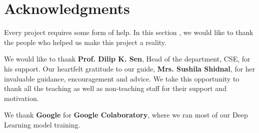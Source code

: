 \documentclass{vldb}
\begin{document}
\section{Acknowledgments}
\noindent Every project requires some form of help. In this section , we would like to thank the people who helped us make this project a reality.
\par\bigskip
We would like to thank \textbf{Prof. Dilip K. Sen}, Head of the department, CSE, for his support. Our heartfelt gratitude to our guide, \textbf{Mrs. Sushila Shidnal}, for her invaluable guidance, encouragement and advice. We take this opportunity to thank all the teaching as well as non-teaching staff for their support and motivation. 
\par\bigskip
We thank \textbf{Google} for \textbf{Google Colaboratory}, where we ran most of our Deep Learning model training.
\par\bigskip

\end{document}
